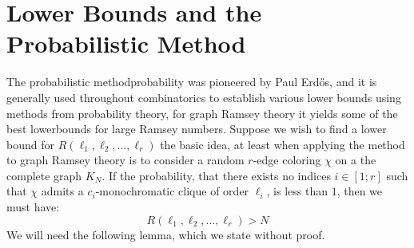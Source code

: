 \section{Lower Bounds and the Probabilistic Method}\label{sec:lower_bound}
The probabilistic methodprobability was pioneered by Paul Erdős, and it is generally used throughout combinatorics to establish various lower bounds using methods from probability theory, for graph Ramsey theory it yields some of the best lowerbounds for large Ramsey numbers. Suppose we wish to find a lower bound for $R(\ell_1, \ell_2, \ldots,  \ell_{r})$ the basic idea, at least when applying the method to graph Ramsey theory is to consider a random $r$-edge coloring $\chi$ on a the complete graph $K_{N}$. If the probability, that there exists no indices $i \in [1; r]$ such that $\chi$ admits a $c_{i}$-monochromatic clique of order $\ell_{i}$, is less than $1$, then we must have:
\begin{equation*}
	R(\ell_1, \ell_2, \ldots, \ell_{r}) > N
\end{equation*}
We will need the following lemma, which we state without proof.

